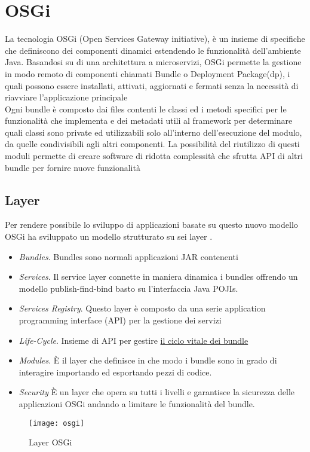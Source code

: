 \section{OSGi}
La tecnologia OSGi (Open Services Gateway initiative),
è un insieme di specifiche che definiscono dei componenti
dinamici estendendo le funzionalità dell'ambiente  Java.
Basandosi su di una architettura a microservizi, OSGi permette la gestione in
modo remoto di componenti chiamati Bundle o Deployment Package(dp), i quali
possono essere installati, attivati, aggiornati e fermati senza la necessità di
riavviare l'applicazione principale\\
Ogni bundle è composto dai files contenti le classi ed i metodi specifici per le
funzionalità che implementa e dei metadati utili al framework
 per determinare quali classi sono private ed utilizzabili solo all'interno
dell'esecuzione del modulo, da quelle condivisibili agli altri componenti. 
La possibilità del riutilizzo di questi moduli permette di
creare software di ridotta complessità che sfrutta API di altri bundle
per fornire nuove funzionalità 
\subsection{Layer}
Per rendere possibile lo sviluppo di applicazioni basate su questo nuovo modello
OSGi ha sviluppato un modello strutturato su sei layer .
\begin{itemize}
        \item   \textit{Bundles}. Bundles sono normali applicazioni JAR contenenti
        \item   \textit{Services}. Il service layer connette in maniera dinamica
                i bundles offrendo un modello publish-find-bind basto su
                l'interfaccia Java POJIs.
        \item   \textit{Services Registry}. Questo layer è composto da una serie
                application programming interface (API) per la gestione dei
                servizi
        \item   \textit{Life-Cycle}. Insieme di API per gestire \hyperlink{cycle_bundle}{il ciclo vitale
                dei bundle}
        \item   \textit{Modules}. È il layer che definisce in che modo i bundle
                sono in grado di interagire importando ed esportando pezzi di
                codice.
        \item   \textit{Security} È un layer che opera su tutti i livelli e
                garantisce la sicurezza delle applicazioni OSGi andando a
                limitare le funzionalità del bundle.
\end{itemize}
\begin{figure}[h]
\centering 
\texttt{[image: osgi]}
\caption{Layer OSGi}
\label{}
\end{figure}

